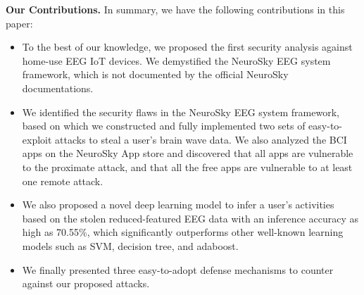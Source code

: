 \indent \textbf{Our Contributions.} In summary, we have the following contributions in this paper:
\begin{itemize}
\item To the best of our knowledge, we proposed the first security analysis against home-use EEG IoT devices. We demystified the NeuroSky EEG system framework, which is not documented by the official NeuroSky documentations.

\item We identified the security flaws in the NeuroSky EEG system framework, based on which we constructed and fully implemented two sets of easy-to-exploit attacks to steal a user's brain wave data. %
We also analyzed the BCI apps on the NeuroSky App store and discovered that all apps are vulnerable to the proximate attack, and that all the free apps are vulnerable to at least one remote attack. %

\item We also proposed a novel deep learning model to infer a user's activities based on the stolen reduced-featured EEG data with an inference accuracy as high as 70.55\%, which significantly outperforms other well-known learning models such as SVM, decision tree, and adaboost.

\item We finally presented three easy-to-adopt defense mechanisms to counter against our proposed attacks.
		
\end{itemize}

